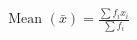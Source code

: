 \documentclass[preview]{standalone}
\begin{document}
\begin{align*}
\text{Mean } (\bar{x}) = \frac{\sum f_i x_i}{\sum f_i}
\end{align*}
\end{document}
